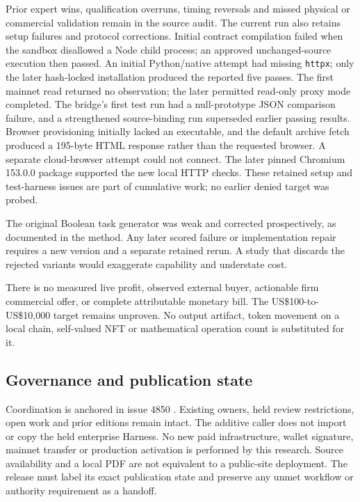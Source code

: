 \documentclass[11pt]{article}
\begin{document}
Prior expert wins, qualification overruns, timing reversals and missed physical or commercial validation remain in the source audit. The current run also retains setup failures and protocol corrections. Initial contract compilation failed when the sandbox disallowed a Node child process; an approved unchanged-source execution then passed. An initial Python/native attempt had missing \texttt{httpx}; only the later hash-locked installation produced the reported five passes. The first mainnet read returned no observation; the later permitted read-only proxy mode completed. The bridge's first test run had a null-prototype JSON comparison failure, and a strengthened source-binding run superseded earlier passing results. Browser provisioning initially lacked an executable, and the default archive fetch produced a 195-byte HTML response rather than the requested browser. A separate cloud-browser attempt could not connect. The later pinned Chromium 153.0.0 package supported the new local HTTP checks. These retained setup and test-harness issues are part of cumulative work; no earlier denied target was probed.

The original Boolean task generator was weak and corrected prospectively, as documented in the method. Any later scored failure or implementation repair requires a new version and a separate retained rerun. A study that discards the rejected variants would exaggerate capability and understate cost.

There is no measured live profit, observed external buyer, actionable firm commercial offer, or complete attributable monetary bill. The US\$100-to-US\$10,000 target remains unproven. No output artifact, token movement on a local chain, self-valued NFT or mathematical operation count is substituted for it.

\subsection{Governance and publication state}

Coordination is anchored in issue 4850 \cite{coordination}. Existing owners, held review restrictions, open work and prior editions remain intact. The additive caller does not import or copy the held enterprise Harness. No new paid infrastructure, wallet signature, mainnet transfer or production activation is performed by this research. Source availability and a local PDF are not equivalent to a public-site deployment. The release must label its exact publication state and preserve any unmet workflow or authority requirement as a handoff.
\end{document}

